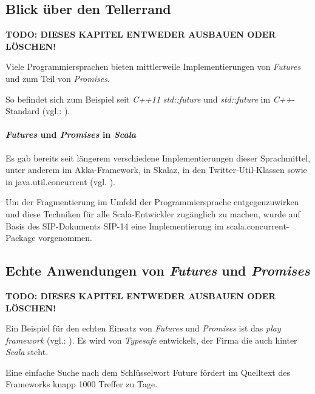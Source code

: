 \subsection{Blick über den Tellerrand}

\textbf{TODO: DIESES KAPITEL ENTWEDER AUSBAUEN ODER LÖSCHEN!}

Viele Programmiersprachen bieten mittlerweile Implementierungen von
\emph{Futures} und zum Teil von \emph{Promises}.

So befindet sich zum Beispiel seit \emph{C++11} \emph{std::future} und
\emph{std::future} im \emph{C++}-Standard (vgl.: \cite{cpp11FAQ}).

\paragraph{\emph{Futures} und \emph{Promises} in \emph{Scala}}

Es gab bereits seit längerem verschiedene Implementierungen dieser Sprachmittel,
unter anderem im Akka-Framework, in Skalaz, in den Twitter-Util-Klassen sowie
in java.util.concurrent (vgl. \cite{futuresTry}).

Um der Fragmentierung im Umfeld der Programmiersprache entgegenzuwirken und
diese Techniken für alle Scala-Entwickler zugänglich zu machen, wurde auf Basis
des SIP-Dokuments SIP-14 eine Implementierung im scala.concurrent-Package
vorgenommen.

\subsection{Echte Anwendungen von \emph{Futures} und \emph{Promises}}

\textbf{TODO: DIESES KAPITEL ENTWEDER AUSBAUEN ODER LÖSCHEN!}

Ein Beispiel für den echten Einsatz von \emph{Futures} und \emph{Promises}
ist das \emph{play framework} (vgl.: \cite{playframework}). Es wird
von \emph{Typesafe} entwickelt, der Firma die auch hinter \emph{Scala}
steht.

Eine einfache Suche nach dem Schlüsselwort \glqq Future\grqq{} fördert
im Quelltext des Frameworks knapp 1000 Treffer zu Tage.
